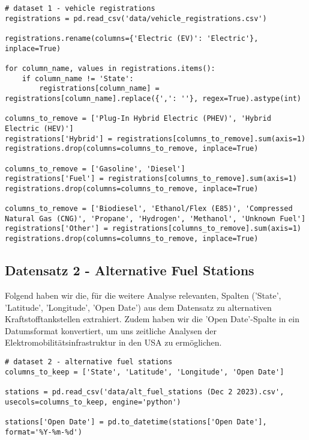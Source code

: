 \begin{verbatim}
# dataset 1 - vehicle registrations
registrations = pd.read_csv('data/vehicle_registrations.csv')

registrations.rename(columns={'Electric (EV)': 'Electric'}, inplace=True)

for column_name, values in registrations.items():
    if column_name != 'State':
        registrations[column_name] = registrations[column_name].replace({',': ''}, regex=True).astype(int)

columns_to_remove = ['Plug-In Hybrid Electric (PHEV)', 'Hybrid Electric (HEV)']
registrations['Hybrid'] = registrations[columns_to_remove].sum(axis=1)
registrations.drop(columns=columns_to_remove, inplace=True)

columns_to_remove = ['Gasoline', 'Diesel']
registrations['Fuel'] = registrations[columns_to_remove].sum(axis=1)
registrations.drop(columns=columns_to_remove, inplace=True)

columns_to_remove = ['Biodiesel', 'Ethanol/Flex (E85)', 'Compressed Natural Gas (CNG)', 'Propane', 'Hydrogen', 'Methanol', 'Unknown Fuel']
registrations['Other'] = registrations[columns_to_remove].sum(axis=1)
registrations.drop(columns=columns_to_remove, inplace=True)
\end{verbatim}

\subsection{Datensatz 2 - Alternative Fuel Stations}

Folgend haben wir die, für die weitere Analyse relevanten, Spalten ('State', 'Latitude', 'Longitude', 'Open Date') aus dem Datensatz zu alternativen Kraftstofftankstellen extrahiert. Zudem haben wir die  'Open Date'-Spalte in ein Datumsformat konvertiert, um uns zeitliche Analysen der Elektromobilitätsinfrastruktur in den USA zu ermöglichen.

\begin{verbatim}
# dataset 2 - alternative fuel stations
columns_to_keep = ['State', 'Latitude', 'Longitude', 'Open Date']

stations = pd.read_csv('data/alt_fuel_stations (Dec 2 2023).csv', usecols=columns_to_keep, engine='python')

stations['Open Date'] = pd.to_datetime(stations['Open Date'], format='%Y-%m-%d')
\end{verbatim}

